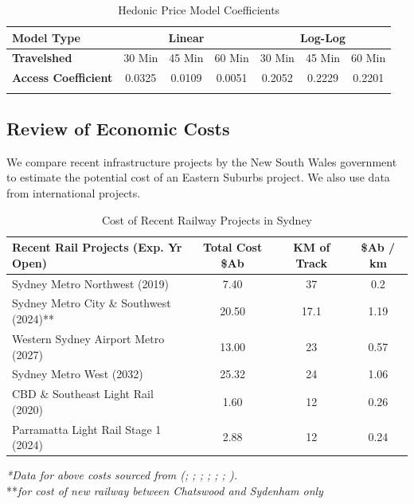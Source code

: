 \documentclass[preprint,12pt,authoryear]{elsarticle}
\begin{document}
\begin{table}[H]
\centering
 
\caption{Hedonic Price Model Coefficients}
\label{HPM}

\begin{tabular}{lcccccc}
    \toprule 
    \textbf{Model Type}& \multicolumn{3}{c}{\textbf{Linear }}& \multicolumn{3}{c}{\textbf{Log-Log }}\\
    \midrule

    \textbf{Travelshed}& 30 Min& 45 Min& 60 Min& 30 Min& 45 Min& 60 Min\\
 \midrule
 \textbf{Access Coefficient}& 0.0325& 0.0109& 0.0051& 0.2052& 0.2229& 0.2201\\
 & & & & & &\\
     \bottomrule
\end{tabular}
\end{table}



\subsection{Review of Economic Costs}\label{Cost Analysis}
\label{sec:economiccosts}
We compare recent infrastructure projects by the New South Wales government to estimate the potential cost of an Eastern Suburbs project. We also use data from international projects. 


\begin{table}[H]
\centering
 
\caption{Cost of Recent Railway Projects in Sydney}

\begin{tabular}{p{4.5cm}ccc}
    \toprule

    \textbf{Recent Rail Projects (Exp. Yr Open)}& Total Cost \$Ab & KM of Track& \$Ab / km\\
    \midrule
 Sydney Metro Northwest (2019)& 7.40& 37&0.2\\
 Sydney Metro City \& Southwest (2024)**& 20.50& 17.1& 1.19\\
 Western Sydney Airport Metro (2027)& 13.00& 23&0.57\\
 Sydney Metro West (2032)& 25.32& 24& 1.06\\
 \midrule
  CBD \& Southeast Light Rail (2020)& 1.60& 12& 0.26\\
  Parramatta Light Rail Stage 1 (2024)& 2.88& 12& 0.24\\
 \bottomrule
\end{tabular}
\end{table}
\textit{*Data for above costs sourced from (\cite{sydneymetro2024}; \cite{sydneymetroSW}; \cite{sydneymetroWSA}; \cite{transportNSW2021LightRail}; \cite{NSWParramattaLightRail2024}; \cite{nswgovernment2024}; \cite{TransitCosts2024}).} \\
**\textit{for cost of new railway between Chatswood and Sydenham only}\\
\end{document}
